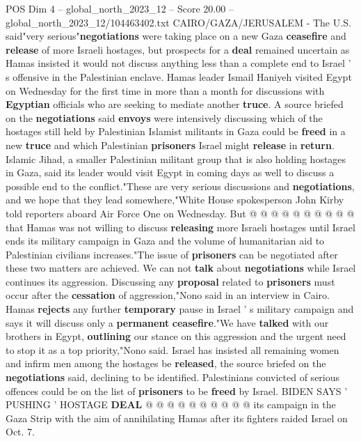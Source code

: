 \begin{textsample}{POS Dim 4 – global\_north\_2023\_12 – Score 20.00 – global\_north\_2023\_12/104463402.txt}  \label{ex:f4_pos_306}
CAIRO/GAZA/JERUSALEM - The U.S. said"very serious"\textbf{negotiations} were taking place on a new Gaza \textbf{ceasefire} and \textbf{release} of more Israeli hostages, but prospects for a \textbf{deal} remained uncertain as Hamas insisted it would not discuss anything less than a complete end to Israel ' s offensive in the Palestinian enclave.
Hamas leader Ismail Haniyeh visited Egypt on Wednesday for the first time in more than a month for discussions with \textbf{Egyptian} officials who are seeking to mediate another \textbf{truce}.
A source briefed on the \textbf{negotiations} said \textbf{envoys} were intensively discussing which of the hostages still held by Palestinian Islamist militants in Gaza could be \textbf{freed} in a new \textbf{truce} and which Palestinian \textbf{prisoners} Israel might \textbf{release} in \textbf{return}.
Islamic Jihad, a smaller Palestinian militant group that is also holding hostages in Gaza, said its leader would visit Egypt in coming days as well to discuss a possible end to the conflict."These are very serious discussions and \textbf{negotiations}, and we hope that they lead somewhere,"White House spokesperson John Kirby told reporters aboard Air Force One on Wednesday.
But @ @ @ @ @ @ @ @ @ @ that Hamas was not willing to discuss \textbf{releasing} more Israeli hostages until Israel ends its military campaign in Gaza and the volume of humanitarian aid to Palestinian civilians increases."The issue of \textbf{prisoners} can be negotiated after these two matters are achieved.
We can not \textbf{talk} about \textbf{negotiations} while Israel continues its aggression.
Discussing any \textbf{proposal} related to \textbf{prisoners} must occur after the \textbf{cessation} of aggression,"Nono said in an interview in Cairo.
Hamas \textbf{rejects} any further \textbf{temporary} pause in Israel ' s military campaign and says it will discuss only a \textbf{permanent} \textbf{ceasefire}."We have \textbf{talked} with our brothers in Egypt, \textbf{outlining} our stance on this aggression and the urgent need to stop it as a top priority,"Nono said.
Israel has insisted all remaining women and infirm men among the hostages be \textbf{released}, the source briefed on the \textbf{negotiations} said, declining to be identified.
Palestinians convicted of serious offences could be on the list of \textbf{prisoners} to be \textbf{freed} by Israel.
BIDEN SAYS ' PUSHING ' HOSTAGE \textbf{DEAL} @ @ @ @ @ @ @ @ @ @ its campaign in the Gaza Strip with the aim of annihilating Hamas after its fighters raided Israel on Oct. 7.

\end{textsample}
